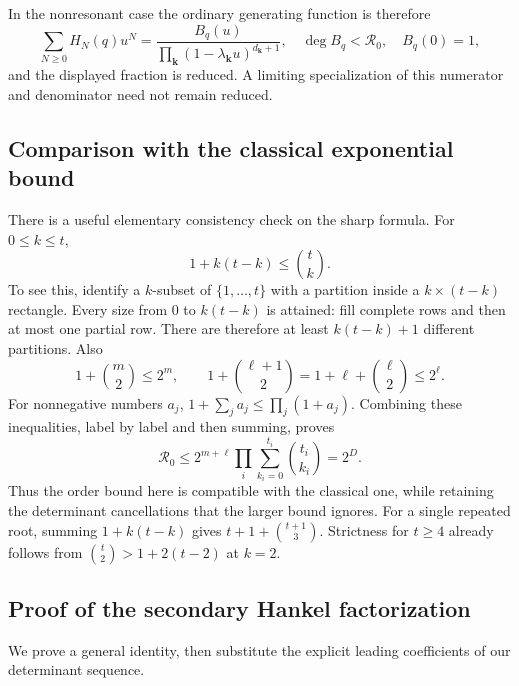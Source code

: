 \documentclass[11pt,a4paper]{article}
\numberwithin{equation}{section}
\theoremstyle{definition}
\theoremstyle{remark}
\newcommand{\bk}{\boldsymbol{k}}
\newcommand{\Rzero}{\mathcal R_0}
\begin{document}
In the nonresonant case the ordinary generating function is therefore
\begin{equation}\label{rc:eq:GF}
 \sum_{N\ge0}H_N(q)u^N
     =\frac{B_q(u)}{\prod_{\bk}(1-\lambda_{\bk}u)^{d_{\bk}+1}},
 \quad \deg B_q<\Rzero,\quad B_q(0)=1,
\end{equation}
and the displayed fraction is reduced.  A limiting specialization of
this numerator and denominator need not remain reduced.

\subsection{Comparison with the classical exponential bound}
There is a useful elementary consistency check on the sharp formula.
For $0\le k\le t$,
\begin{equation}\label{rc:eq:localbound}
 1+k(t-k)\le\binom tk.
\end{equation}
To see this, identify a $k$-subset of $\{1,\ldots,t\}$ with a partition
inside a $k\times(t-k)$ rectangle.  Every size from $0$ to $k(t-k)$
is attained: fill complete rows and then at most one partial row.
There are therefore at least $k(t-k)+1$ different partitions.
Also
\[
 1+\binom m2\le2^m,\qquad
 1+\binom{\ell+1}2=1+\ell+\binom\ell2\le2^\ell.
\]
For nonnegative numbers $a_j$, $1+\sum_j a_j\le\prod_j(1+a_j)$.
Combining these inequalities, label by label and then summing, proves
\begin{equation}\label{rc:eq:universalbound}
 \Rzero\le2^{m+\ell}\prod_i\sum_{k_i=0}^{t_i}\binom{t_i}{k_i}
          =2^D.
\end{equation}
Thus the order bound here is compatible with the classical one, while
retaining the determinant cancellations that the larger bound ignores.
For a single repeated root, summing $1+k(t-k)$ gives
$t+1+\binom{t+1}{3}$.  Strictness for $t\ge4$ already follows from
$\binom t2>1+2(t-2)$ at $k=2$.

\subsection{Proof of the secondary Hankel factorization}
We prove a general identity, then substitute the explicit leading
coefficients of our determinant sequence.
\end{document}
